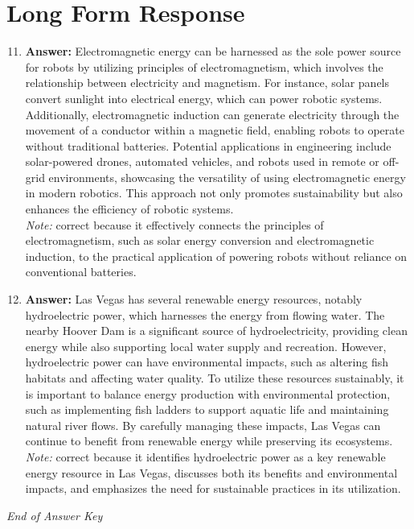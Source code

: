 \documentclass[12pt]{article}
\begin{document}
\section*{Long Form Response}
\begin{enumerate}[label=\arabic*.]
\setcounter{enumi}{10}
\item \textbf{Answer:} Electromagnetic energy can be harnessed as the sole power source for robots by utilizing principles of electromagnetism, which involves the relationship between electricity and magnetism. For instance, solar panels convert sunlight into electrical energy, which can power robotic systems. Additionally, electromagnetic induction can generate electricity through the movement of a conductor within a magnetic field, enabling robots to operate without traditional batteries. Potential applications in engineering include solar-powered drones, automated vehicles, and robots used in remote or off-grid environments, showcasing the versatility of using electromagnetic energy in modern robotics. This approach not only promotes sustainability but also enhances the efficiency of robotic systems.
\\ \textit{Note:} correct because it effectively connects the principles of electromagnetism, such as solar energy conversion and electromagnetic induction, to the practical application of powering robots without reliance on conventional batteries.
\item \textbf{Answer:} Las Vegas has several renewable energy resources, notably hydroelectric power, which harnesses the energy from flowing water. The nearby Hoover Dam is a significant source of hydroelectricity, providing clean energy while also supporting local water supply and recreation. However, hydroelectric power can have environmental impacts, such as altering fish habitats and affecting water quality. To utilize these resources sustainably, it is important to balance energy production with environmental protection, such as implementing fish ladders to support aquatic life and maintaining natural river flows. By carefully managing these impacts, Las Vegas can continue to benefit from renewable energy while preserving its ecosystems.
\\ \textit{Note:} correct because it identifies hydroelectric power as a key renewable energy resource in Las Vegas, discusses both its benefits and environmental impacts, and emphasizes the need for sustainable practices in its utilization.
\end{enumerate}

\vfill
\noindent\textit{End of Answer Key}
\end{document}
